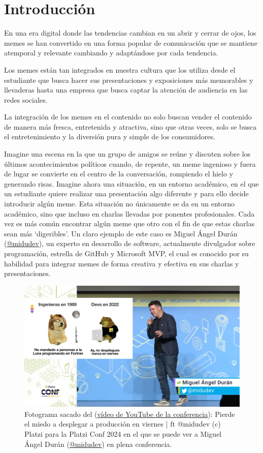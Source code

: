 \chapter{Introducción}

En una era digital donde las tendencias cambian en un abrir y cerrar de ojos, los memes se han convertido en una forma popular de comunicación que se mantiene atemporal y relevante cambiando y adaptándose por cada tendencia.

Los memes están tan integrados en nuestra cultura que los utiliza desde el estudiante que busca hacer sus presentaciones y exposiciones más memorables y llevaderas hasta una empresa que busca captar la atención de audiencia en las redes sociales.

La integración de los memes en el contenido no solo buscan vender el contenido de manera más fresca, entretenida y atractiva, sino que otras veces, solo se busca el entretenimiento y la diversión pura y simple de los consumidores.

Imagine una escena en la que un grupo de amigos se reúne y discuten sobre los últimos acontecimientos políticos cuando, de repente, un meme ingenioso y fuera de lugar se convierte en el centro de la conversación, rompiendo el hielo y generando risas. Imagine ahora una situación, en un entorno académico, en el que un estudiante quiere realizar una presentación algo diferente y para ello decide introducir algún meme. Esta situación no únicamente se da en un entorno académico, sino que incluso en charlas llevadas por ponentes profesionales. Cada vez es más común encontrar algún meme que otro con el fin de que estas charlas sean más `digeribles'. Un claro ejemplo de este caso es Miguel Ángel Durán (\href{https://midu.dev/}{@midudev}), un experto en desarrollo de software, actualmente divulgador sobre programación, estrella de GitHub y Microsoft MVP, el cual es conocido por su habilidad para integrar memes de forma creativa y efectiva en sus charlas y presentaciones.

\begin{figure}[ht]
    \caption{Fotograma sacado del (\href{http://sl.ugr.es/0dXQ}{vídeo de YouTube de la conferencia}): Pierde el miedo a desplegar a producción en viernes | ft @midudev (c) Platzi para la Platzi Conf 2024 en el que se puede ver a Miguel Ángel Durán (\href{https://midu.dev/}{@midudev}) en plena conferencia.}
    \centering
    \vspace*{0.5cm}
    \includegraphics[scale=0.15]{figuras/platziconfmidudev.png}
\end{figure}

